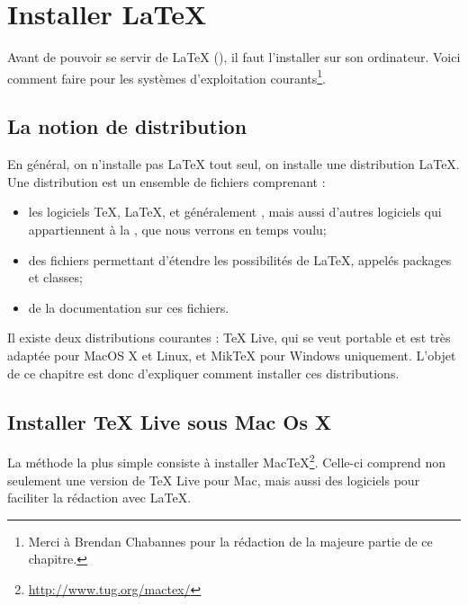 \chapter {Installer \LaTeX{}}\label{install}

\begin{intro}
    Avant de pouvoir se servir de \LaTeX{} (\XeLaTeX), il faut l'installer sur son ordinateur. Voici comment faire pour les systèmes d'exploitation courants\footnote{Merci à Brendan Chabannes pour la rédaction de la majeure partie de ce chapitre.}.
\end{intro}

\section{La notion de distribution}

En général, on n'installe pas \LaTeX{} tout seul, on installe une distribution \LaTeX{}. Une distribution est un ensemble de fichiers comprenant :
\begin{itemize}
\item les logiciels \TeX, \LaTeX, et généralement \XeLaTeX, mais aussi d'autres logiciels qui appartiennent à la  , que nous verrons en temps voulu;
\item des fichiers permettant d'étendre les possibilités de \LaTeX, appelés packages et classes;
\item de la documentation sur ces fichiers.
\end{itemize}

Il existe deux distributions courantes : TeX Live, qui se veut portable et est très adaptée pour MacOS X et Linux, et MikTeX pour Windows uniquement. L'objet de ce chapitre est donc d'expliquer comment installer ces distributions.

\section{Installer TeX Live sous Mac Os X}

La méthode la plus simple consiste à installer MacTeX\footnote{\url{http://www.tug.org/mactex/}}. Celle-ci comprend non seulement une version de TeX Live pour Mac, mais aussi des logiciels pour faciliter la rédaction avec \LaTeX{}.

